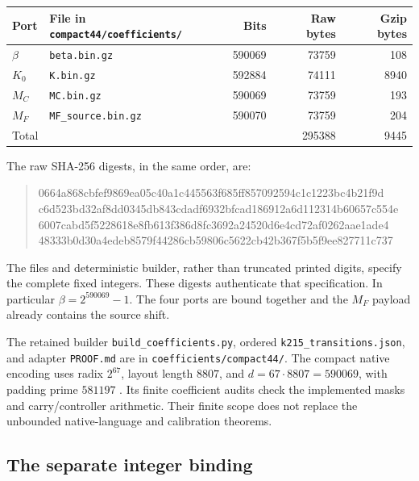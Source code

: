 \documentclass[11pt,a4paper]{article}
\theoremstyle{definition}
\theoremstyle{remark}
\newcommand{\sourcepath}[1]{\texttt{\small #1}}
\begin{document}
\begin{center}
\begin{tabular}{@{}llrrr@{}}
\toprule
Port & File in \sourcepath{compact44/coefficients/}
 & Bits & Raw bytes & Gzip bytes\\
\midrule
\(\beta\) & \sourcepath{beta.bin.gz} & 590069 & 73759 & 108\\
\(K_0\) & \sourcepath{K.bin.gz} & 592884 & 74111 & 8940\\
\(M_C\) & \sourcepath{MC.bin.gz} & 590069 & 73759 & 193\\
\(M_F\) & \sourcepath{MF\_source.bin.gz} & 590070 & 73759 & 204\\
\midrule
Total & & & 295388 & 9445\\
\bottomrule
\end{tabular}
\end{center}

The raw SHA-256 digests, in the same order, are:
\begin{quote}
\scriptsize\ttfamily
0664a868cbfef9869ea05c40a1c445563f685ff857092594c1c1223bc4b21f9d\\
c6d523bd32af8dd0345db843cdadf6932bfcad186912a6d112314b60657c554e\\
6007cabd5f5228618e8fb613f386d8fc3692a24520d6e4cd72af0262aae1ade4\\
48333b0d30a4edeb8579f44286cb59806c5622cb42b367f5b5f9ee827711c737
\end{quote}
The files and deterministic builder, rather than truncated printed
digits, specify the complete fixed integers. These digests authenticate
that specification. In particular \(\beta=2^{590069}-1\).
The four ports are bound together and the \(M_F\) payload already contains
the source shift.

The retained builder \sourcepath{build\_coefficients.py}, ordered
\sourcepath{k215\_transitions.json}, and adapter
\sourcepath{PROOF.md} are in \sourcepath{coefficients/compact44/}.
The compact native encoding uses radix \(2^{67}\), layout length \(8807\),
and \(d=67\cdot8807=590069\), with padding prime \(581197\)
\cite{source44}. Its finite coefficient audits check the implemented
masks and carry/controller arithmetic. Their finite scope does not
replace the unbounded native-language and calibration theorems.

\subsection{The separate integer binding}
\end{document}
